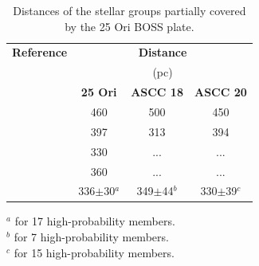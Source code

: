 \documentclass[12pt]{article}
\begin{document}
\begin{table} \scriptsize
\begin{center}
 \caption[Distances for the clusters where lie the confirmed members from the BOSS spectra]{Distances of the stellar groups partially covered by the 25 Ori BOSS plate.}
 \label{tab_BOSS:distances}
 \begin{threeparttable}
  	\setlength{\tabcolsep}{15pt}
	\begin{tabular}{lccc}
	\toprule
	{\bf Reference} & \multicolumn{3}{c}{{\bf Distance}} \\
		            & \multicolumn{3}{c}{(pc)} \\
	\cline{2-4}
 	            & {\bf 25 Ori} & {\bf ASCC 18} & {\bf ASCC 20} \\
	\midrule
	\citet{Kharchenko2005}          & 460            & 500            & 450 \\
	\citet{Kharchenko2013}          & 397            & 313            & 394 \\
	\citet{Briceno2005,Briceno2007} & 330            & ...            & ... \\
	\citet{Downes2014}              & 360            & ...            & ... \\
	\citet{GaiaCollaboration2016}   & 336$\pm$30$^a$ & 349$\pm$44$^b$ & 330$\pm$39$^c$ \\
	\bottomrule
	\end{tabular}
	\begin{tablenotes}
	  $^a$ for 17 high-probability members.\\
	  $^b$ for 7 high-probability members.\\
	  $^c$ for 15 high-probability members.\\
	\end{tablenotes}
 \end{threeparttable}
\end{center}
\end{table}
\end{document}
